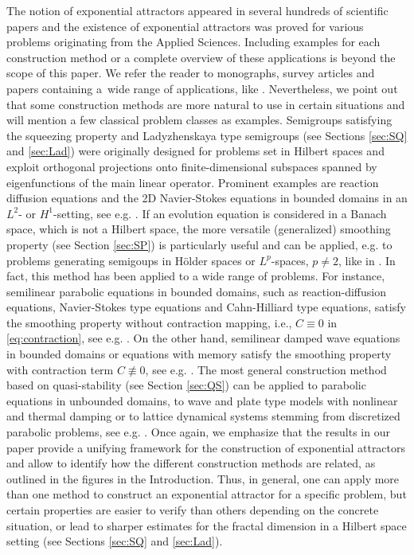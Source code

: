 \documentclass[a4paper,12pt,reqno]{amsart}
\theoremstyle{plain}
\theoremstyle{definition}
\numberwithin{equation}{section}
\begin{document}
The notion of exponential attractors appeared in several hundreds of scientific papers and the existence of exponential attractors was proved for various problems originating from the Applied Sciences. Including examples for each construction method or a complete overview of these applications is beyond the scope of this paper. 
We refer the reader to monographs, survey articles and papers containing a~wide range of applications, like \cite{chueshov,cl2008,EFNT94, MiZe, CCM}. Nevertheless, we point out that some construction methods are more natural to use in certain situations and will mention a few classical problem classes as examples.  Semigroups satisfying the squeezing property and Ladyzhenskaya type semigroups (see Sections \ref{sec:SQ} and \ref{sec:Lad})  were originally designed for problems set in Hilbert spaces and exploit orthogonal projections onto finite-dimensional subspaces spanned by eigenfunctions of the main linear operator. Prominent examples are reaction diffusion equations and the 2D Navier-Stokes equations in bounded domains in an $L^2$- or $H^1$-setting, see e.g. \cite{EFNT94}. 
If an evolution equation is considered in a Banach space, which is not a Hilbert space, the more versatile (generalized) smoothing property (see Section \ref{sec:SP}) is particularly useful and can be applied, e.g. to problems generating semigoups in H\"older spaces or $L^p$-spaces, $p\neq2$, like in \cite{CaSo14, EfMiZe}. 
In fact, this method has been applied to a wide range of problems. For instance, semilinear parabolic equations in bounded domains, such as reaction-diffusion equations, Navier-Stokes type equations and Cahn-Hilliard type equations, satisfy the smoothing property without contraction mapping, i.e., $C\equiv0$ in \eqref{eq:contraction}, see e.g. \cite{EfMiZe,KoSo1, MiZe05}. On the other hand, semilinear damped wave equations in bounded domains or equations with memory satisfy the smoothing property with contraction term $C\not\equiv 0$, see e.g. \cite{CaSo14,CCM, GGP,KoSo}. 
The most general construction method based on quasi-stability (see Section \ref{sec:QS}) can be applied to parabolic equations in unbounded domains, to wave and plate type models with nonlinear and thermal damping or to lattice dynamical systems stemming from discretized parabolic problems, see e.g.  \cite{chueshov,cl2008,CC20,CC21,CC23}. 
Once again, we emphasize that the results in our paper provide a unifying framework for the construction of exponential attractors and allow to identify how the different construction methods are related, as outlined in the figures in the Introduction. Thus, in general, one can apply more than one method to construct an exponential attractor for a specific problem, but certain properties are easier to verify than others depending on the concrete situation, or lead to sharper estimates for the fractal dimension in a Hilbert space setting (see Sections \ref{sec:SQ} and \ref{sec:Lad}). 
\end{document}
